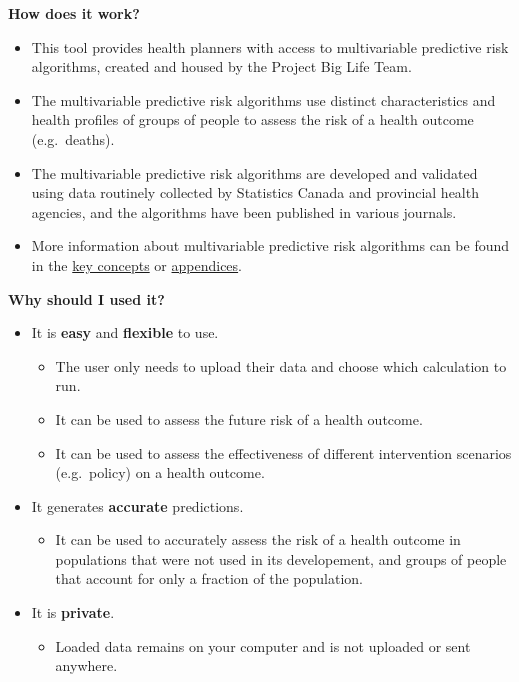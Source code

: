 \documentclass[]{book}
\providecommand{\tightlist}{%
  \setlength{\itemsep}{0pt}\setlength{\parskip}{0pt}}
\begin{document}
\textbf{How does it work?}

\begin{itemize}
\item
  This tool provides health planners with access to multivariable
  predictive risk algorithms, created and housed by the Project Big Life
  Team.
\item
  The multivariable predictive risk algorithms use distinct
  characteristics and health profiles of groups of people to assess the
  risk of a health outcome (e.g.~deaths).
\item
  The multivariable predictive risk algorithms are developed and
  validated using data routinely collected by Statistics Canada and
  provincial health agencies, and the algorithms have been published in
  various journals.
\item
  More information about multivariable predictive risk algorithms can be
  found in the \protect\hyperlink{keyconcepts}{key concepts} or
  \protect\hyperlink{mport}{appendices}.
\end{itemize}

\textbf{Why should I used it?}

\begin{itemize}
\item
  It is \textbf{easy} and \textbf{flexible} to use.

  \begin{itemize}
  \tightlist
  \item
    The user only needs to upload their data and choose which
    calculation to run.
  \item
    It can be used to assess the future risk of a health outcome.
  \item
    It can be used to assess the effectiveness of different intervention
    scenarios (e.g.~policy) on a health outcome.
  \end{itemize}
\item
  It generates \textbf{accurate} predictions.

  \begin{itemize}
  \tightlist
  \item
    It can be used to accurately assess the risk of a health outcome in
    populations that were not used in its developement, and groups of
    people that account for only a fraction of the population.
  \end{itemize}
\item
  It is \textbf{private}.

  \begin{itemize}
  \tightlist
  \item
    Loaded data remains on your computer and is not uploaded or sent
    anywhere.
  \end{itemize}
\end{itemize}
\end{document}
